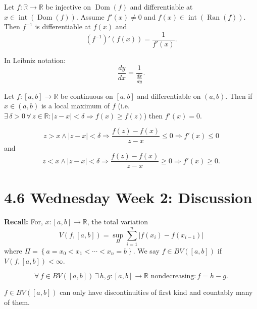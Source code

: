 \documentclass{notes}
\begin{document}
  \begin{lem}
    Let $f \colon \mathbb R \to \mathbb R$ be injective on $\operatorname{Dom}(f)$ and differentiable at $x \in \operatorname{int}(\operatorname{Dom}(f))$.
    Assume $f'(x) \neq 0$ and $f(x) \in \operatorname{int}(\operatorname{Ran}(f))$.
    Then $f^{-1}$ is differentiable at $f(x)$ and 
    \[
      (f^{-1})'(f(x)) = \frac{1}{f'(x)}.
    \]
    
    In Leibniz notation: 
    \[
      \frac{dy}{dx} = \frac{1}{\frac{dx}{dy}}.
    \]
  \end{lem}
  
  \begin{lem}
    Let $f \colon [a, b] \to \mathbb R$ be continuous on $[a, b]$ and differentiable on $(a, b)$.
    Then if $x \in (a, b)$ is a local maximum of $f$ (i.e. $\exists \, \delta > 0 \, \forall \, z \in \mathbb R: \left | z - x \right | < \delta \Rightarrow f(x) \geq f(z)$) then $f'(x) = 0$.
  \end{lem}
  
  \begin{prf}
    \[
      z > x \land \left | z - x \right | < \delta \Rightarrow \frac{f(z) - f(x)}{z - x} \leq 0 \Rightarrow f'(x) \leq 0
    \]
    and 
    \[
      z < x \land \left | z - x \right | < \delta \Rightarrow \frac{f(z) - f(x)}{z - x} \geq 0 \Rightarrow f'(x) \geq 0.
    \]
  \end{prf}
  
  \section{4.6 Wednesday Week 2: Discussion}
  
  {\boldmath \bfseries Recall:} For, $x \colon [a, b] \to \mathbb R$, the total variation
  \[
    V(f, [a, b]) = \sup_{\Pi} \sum_{i = 1}^n \left | f(x_i) -f(x_{i - 1})  \right |
  \]
  where $\Pi = \left \{ a = x_0 < x_1 < \cdots < x_n = b  \right \}$.
  We say $f \in BV([a, b])$ if $V(f, [a, b]) < \infty$.
  
  \begin{thm}
    \[
      \forall \, f \in BV([a, b]) \, \exists \, h, g \colon [a, b] \to \mathbb R \text{ nondecreasing}: f = h - g.
    \]
  \end{thm}
  
  \begin{cor}
    $f \in BV([a, b])$ can only have discontinuities of first kind and countably many of them.
  \end{cor}
  
\end{document}

